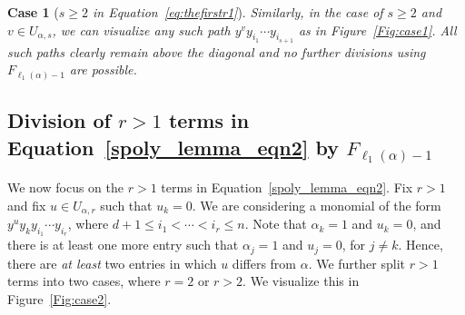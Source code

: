 \documentclass[10pt,a4paper]{article}
\newcounter{casecount}  \setcounter{casecount}{0}
\newtheorem{case}[casecount]{Case}
\begin{document}
\begin{case}[{\it $s \geq 2$ in Equation~\eqref{eq:thefirstr1}}\null] \label{rgeq2}
    Similarly, in the case of $s \geq 2$ and $v \in U_{\alpha, s}$, we can visualize any such path $y^{v}y_{i_1} \cdots y_{i_{s+1}}$ as in Figure~\ref{Fig:case1}.
All such paths clearly remain above the diagonal and no further divisions using $F_{\ell_1(\alpha)-1}$ are possible.
\end{case}	

\subsection{Division of $r>1$ terms in Equation~\eqref{spoly_lemma_eqn2} by $F_{\ell_1(\alpha)-1}$} \label{beta_redu}
We now focus on the  $r>1$ terms in Equation~\eqref{spoly_lemma_eqn2}. 
Fix $r>1$ and fix $u \in U_{\alpha, r}$ such that $u_k=0$. We are considering a monomial of the form 
$y^{u}y_k y_{i_1} \cdots y_{i_{r}}  $, where $d+1 \leq i_1 < \cdots < i_r \leq n$.
Note that $\alpha_k = 1$ and $u_k =0$, and there is at least one more entry such that $\alpha_j = 1$ and $u_j = 0$, for $j \ne k$. Hence, there are \textit{at least} two entries in which $u$ differs from $\alpha$. We further split $r>1$ terms into two cases, where $r=2$ or $r>2$.
We visualize this in Figure~\ref{Fig:case2}.
\end{document}
